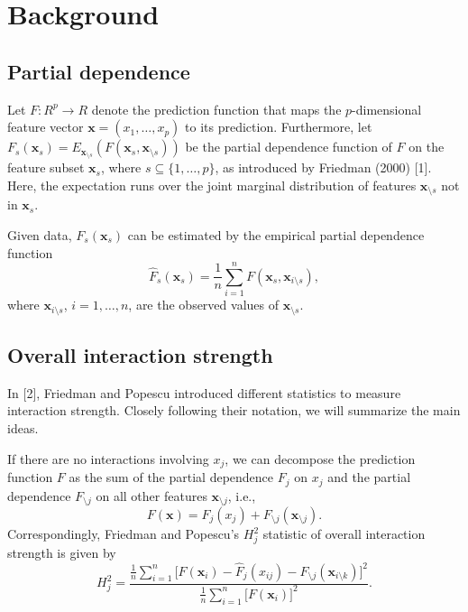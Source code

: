 \documentclass[]{article}
\title{}
\author{}
\begin{document}
\section{Background}
\subsection{Partial dependence}
Let $F: R^p \to R$ denote the prediction function that maps the $p$-dimensional feature vector $\mathbf{x} = (x_1, \dots, x_p)$ to its prediction.
Furthermore, let $F_s(\mathbf{x}_s) = E_{\mathbf{x}_{\setminus s}}(F(\mathbf{x}_s, \mathbf{x}_{\setminus s}))$ be the partial dependence function of $F$ on the feature subset $\mathbf{x}_s$, where $s \subseteq \{1, \dots, p\}$, as introduced by Friedman (2000) [1]. Here, the expectation runs over the joint marginal distribution of features $\mathbf{x}_{\setminus s}$ not in $\mathbf{x}_s$.

Given data, $F_s(\mathbf{x}_s)$ can be estimated by the empirical partial dependence function
$$
  \hat F_s(\mathbf{x}_s) = \frac{1}{n} \sum_{i = 1}^n F(\mathbf{x}_s, \mathbf{x}_{i\setminus s}),
$$
where $\mathbf{x}_{i\setminus s}$, $i = 1, \dots, n$, are the observed values of $\mathbf{x}_{\setminus s}$.

\subsection{Overall interaction strength}
In [2], Friedman and Popescu introduced different statistics to measure interaction strength. Closely following their notation, we will summarize the main ideas. 

If there are no interactions involving $x_j$, we can decompose the prediction function $F$ as the sum of the partial dependence $F_j$ on $x_j$ and the partial dependence $F_{\setminus j}$ on all other features $\mathbf{x}_{\setminus j}$, i.e.,
$$
	F(\mathbf{x}) = F_j(x_j) + F_{\setminus j}(\mathbf{x}_{\setminus j}).
$$
Correspondingly, Friedman and Popescu's $H^2_j$ statistic of overall interaction strength is given by
$$
	H_{j}^2 = \frac{\frac{1}{n} \sum_{i = 1}^n\big[F(\mathbf{x}_i) - \hat F_j(x_{ij}) - \hat F_{\setminus j}(\mathbf{x}_{i\setminus k})\big]^2}{\frac{1}{n} \sum_{i = 1}^n\big[F(\mathbf{x}_i)\big]^2}.
$$
\end{document}
